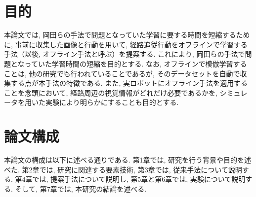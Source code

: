 \newpage
\section{目的}
本論文では, 岡田らの手法で問題となっていた学習に要する時間を短縮するために, 事前に収集した画像と行動を用いて, 経路追従行動をオフラインで学習する手法（以後, オフライン手法と呼ぶ）を提案する. これにより, 岡田らの手法で問題となっていた学習時間の短縮を目的とする. なお, オフラインで模倣学習することは, 他の研究でも行われていることであるが, そのデータセットを自動で収集する点が本手法の特徴である. また, 実ロボットにオフライン手法を適用することを念頭において, 経路周辺の視覚情報がどれだけ必要であるかを, シミュレータを用いた実験により明らかにすることも目的とする.
\section{論文構成}
本論文の構成は以下に述べる通りである. 第1章では, 研究を行う背景や目的を述べた. 第2章では, 研究に関連する要素技術, 第3章では, 従来手法について説明する. 第4章では, 提案手法について説明し, 第5章と第6章では, 実験について説明する. そして, 第7章では, 本研究の結論を述べる. 
     

